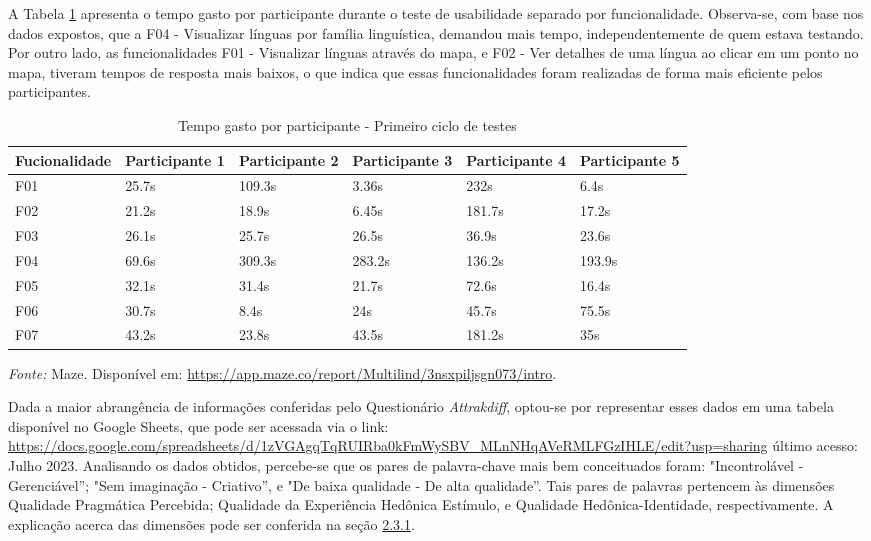 A Tabela \ref{tab06} apresenta o tempo gasto por participante durante o teste de usabilidade separado por funcionalidade. Observa-se, com base nos dados expostos, que a F04 - Visualizar línguas por família linguística, 
demandou mais tempo, independentemente de quem estava testando. Por outro lado, as funcionalidades F01 - Visualizar línguas através do mapa, e F02 - Ver detalhes de uma língua ao clicar em um ponto no mapa, tiveram tempos 
de resposta mais baixos, o que indica que essas funcionalidades foram realizadas de forma mais eficiente pelos participantes.

\begin{table}[h!]
	\centering
	\caption{Tempo gasto por participante - Primeiro ciclo de testes}
	\label{tab06}
	\begin{adjustbox}{center}
	\begin{tabular}{l|l|l|l|l|l}
	\hline
	Fucionalidade & Participante 1 & Participante 2 & Participante 3 & Participante 4 & Participante 5 \\ 	\hline
	F01                   & 25.7s     & 109.3s     & 3.36s      & 232s       & 6.4s      \\
	F02                   & 21.2s        & 18.9s      & 6.45s      & 181.7s    & 17.2s     \\
	F03                   & 26.1s        & 25.7s      & 26.5s      & 36.9s     & 23.6s     \\
	F04                   & 69.6s        & 309.3s     & 283.2s     & 136.2s     & 193.9s     \\
	F05                   & 32.1s      & 31.4s      & 21.7s     & 72.6s     & 16.4s     \\
	F06                   & 30.7s     & 8.4s      & 24s     & 45.7s     & 75.5s     \\
	F07                   & 43.2s     & 23.8s      & 43.5s     & 181.2s    & 35s      \\ 	\hline
	\end{tabular}
	\end{adjustbox}
	\begin{tablenotes}[flushleft]
		\centering
		\item \textit{Fonte:} Maze. Disponível em: \url{https://app.maze.co/report/Multilind/3nsxpiljsgn073/intro}.
	  \end{tablenotes}
\end{table}


Dada a maior abrangência de informações conferidas pelo Questionário \textit{Attrakdiff}, optou-se por representar esses dados em uma tabela disponível no Google Sheets, que pode ser acessada via o link: 
\url{https://docs.google.com/spreadsheets/d/1zVGAgqTqRUIRba0kFmWySBV_MLnNHqAVeRMLFGzIHLE/edit?usp=sharing} último acesso: Julho 2023. Analisando os dados obtidos, percebe-se que os pares de palavra-chave 
mais bem conceituados foram: "Incontrolável - Gerenciável''; "Sem imaginação - Criativo'', e "De baixa qualidade - De alta qualidade''. Tais pares de palavras pertencem às dimensões Qualidade Pragmática Percebida;
Qualidade da Experiência Hedônica Estímulo, e Qualidade Hedônica-Identidade, respectivamente. A explicação acerca das dimensões pode ser conferida na seção \hyperref[sec:Medicao2]{2.3.1}. 

